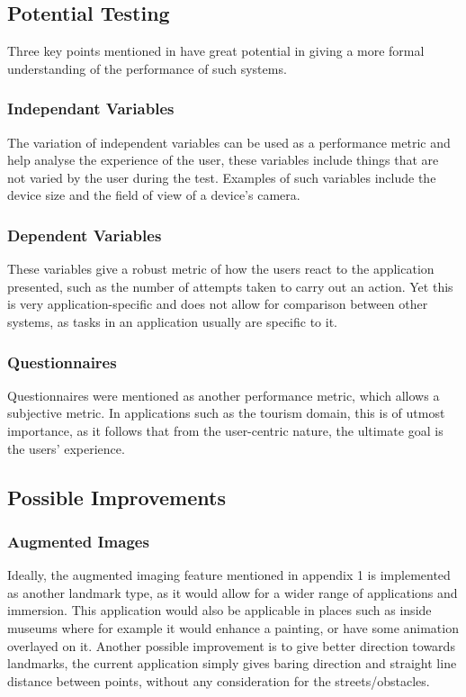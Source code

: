 \subsection{Potential Testing}
Three key points mentioned in \cite{Samini2017} have great potential in giving a more formal understanding of the performance of such systems. 
\subsubsection{Independant Variables}
The variation of independent variables can be used as a performance metric and help analyse the experience of the user, these variables include things that are not 
varied by the user during the test. Examples of such variables include the device size and the field of view of a device's 
camera.
\subsubsection{Dependent Variables}
These variables give a robust metric of how the users react to the 
application presented, such as the number of attempts taken to carry out an action.
Yet this is very application-specific and does not allow for comparison between other systems, as 
tasks in an application usually are specific to it.

\subsubsection{Questionnaires}
Questionnaires were mentioned as another performance metric, which allows a subjective metric. 
In applications such as the tourism domain, this is of utmost importance, as it follows that 
from the user-centric nature, the ultimate goal is the users' experience.  

\subsection{Possible Improvements}
\subsubsection{Augmented Images}
Ideally, the augmented imaging feature mentioned in appendix 1 is implemented as another landmark type, as it would allow for a wider range of applications and immersion.
This application would also be applicable in places such as inside museums where for example it would enhance a painting, or have some animation overlayed on it.
\noindent
Another possible improvement is to give better direction towards landmarks, the current application simply gives baring direction and straight line distance between points,
 without any consideration for the streets/obstacles.
